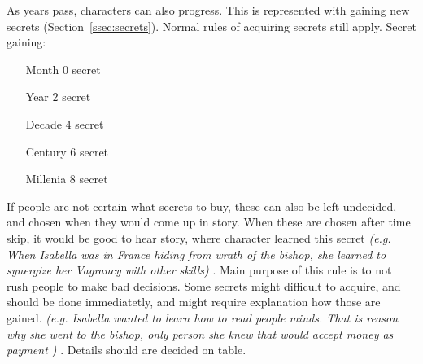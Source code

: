 As years pass, characters can also progress.
This is represented with gaining new secrets (Section~\ref{ssec:secrets}).
Normal rules of acquiring secrets still apply.
Secret gaining:
\begin{itemize}
\item[Month] 0 secret
\item[Year] 2 secret
\item[Decade] 4 secret
\item[Century] 6 secret
\item[Millenia] 8 secret
\end{itemize}
If people are not certain what secrets to buy, these can also be left undecided, and chosen when they would come up in story.
When these are chosen after time skip, it would be good to hear story, where character learned this secret
   \textit{(e.g. When Isabella was in France hiding from wrath of the bishop, she learned to synergize her Vagrancy with other skills) }.
Main purpose of this rule is to not rush people to make bad decisions.
Some secrets might difficult to acquire, and should be done immediatetly, and might require explanation how those are gained.
   \textit{(e.g. Isabella wanted to learn how to read people minds. That is reason why she went to the bishop, only person she knew that would accept money as payment ) }.
Details should are decided on table.

